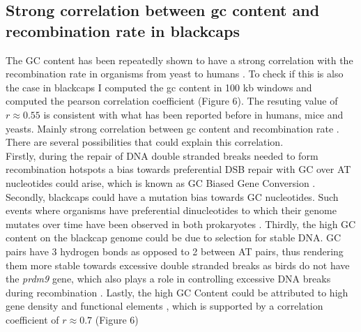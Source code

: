\documentclass[12pt,a4paper]{article}
\begin{document}
\subsection{Strong correlation between gc content and recombination rate in blackcaps}
The GC content has been repeatedly shown to have a strong correlation with the recombination rate in
organisms from yeast to humans \parencite{kiktev2018, Chen2006, Fullerton2001}. To check if this is
also the case in blackcaps I computed the gc content in 100 kb windows and computed the pearson
correlation coefficient (Figure 6). The resuting value of $r \approx 0.55$ is consistent with what
has been reported before in humans, mice and yeasts. Mainly strong correlation between gc content
and recombination rate \parencite{kiktev2018, Chen2006, Fullerton2001}. There are several
possibilities that could explain this correlation. \\
Firstly, during the repair of DNA double stranded breaks needed to form recombination hotspots a
bias towards preferential DSB repair with GC over AT nucleotides could arise, which is known as GC
Biased Gene Conversion \parencite{Bolivar2019,
	DuretGaltier2009}. Secondly, blackcaps could have a mutation bias towards GC nucleotides. Such
events where organisms have preferential dinucleotides to which their genome mutates over time have
been observed in both prokaryotes \parencite{Hershberg2010}. Thirdly, the high GC content on the
blackcap genome could be due to selection for stable DNA. GC pairs have 3 hydrogen bonds as opposed
to 2 between AT pairs, thus rendering them more stable towards excessive double stranded breaks as
birds do not have the \textit{prdm9} gene, which also plays a role in controlling excessive DNA
breaks during recombination \parencite{paiano_atm_2020, MustonenLaessig2005}. Lastly, the high GC
Content could be attributed to high gene density and functional elements \parencite{Bird1986}, which
is supported by a correlation coefficient of $r \approx 0.7$ (Figure 6)
\end{document}
